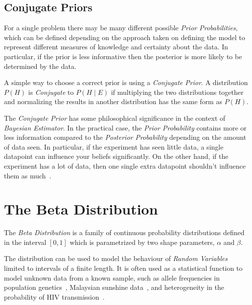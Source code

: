 \subsection{Conjugate Priors}
\label{subsec:conjugate}

For a single problem there may be many different possible \emph{Prior Probabilities}, which can be defined depending on the approach taken on defining the model to represent different measures of knowledge and certainty about the data\footnotemark{}. In particular, if the prior is less informative then the posterior is more likely to be determined by the data.


A simple way to choose a correct prior is using a \emph{Conjugate Prior}. A distribution $P \left( H \right)$ is \emph{Conjugate} to $P \left( H \mid E \right)$ if multiplying the two distributions together and normalizing the results in another distribution has the same form as $P \left( H \right)$.

The \emph{Conjugate Prior} has some philosophical significance in the context of \emph{Bayesian Estimator}. In the practical case, the \emph{Prior Probability} contains more or less information compared to the \emph{Posterior Probability} depending on the amount of data seen. In particular, if the experiment has seen little data, a single datapoint can influence your beliefs significantly. On the other hand, if the experiment has a lot of data, then one single extra datapoint shouldn't influence them as much~\cite{gelman2003}.

\section{The Beta Distribution}
\label{subsec:beta}

The \emph{Beta Distribution} is a family of continuous probability distributions defined in the interval $\left[ 0, 1 \right]$ which is parametrized by two shape parameters, $\alpha$ and $\beta$.

The distribution can be used to model the behaviour of \emph{Random Variables} limited to intervals of a finite length. It is often used as a statistical function to model unknown data from a known sample, such as allele frequencies in population genetics~\cite{Balding1995}, Malaysian sunshine data~\cite{Sulaiman1999573}, and heterogeneity in the probability of HIV transmission~\cite{SIM:SIM4780080110}.

